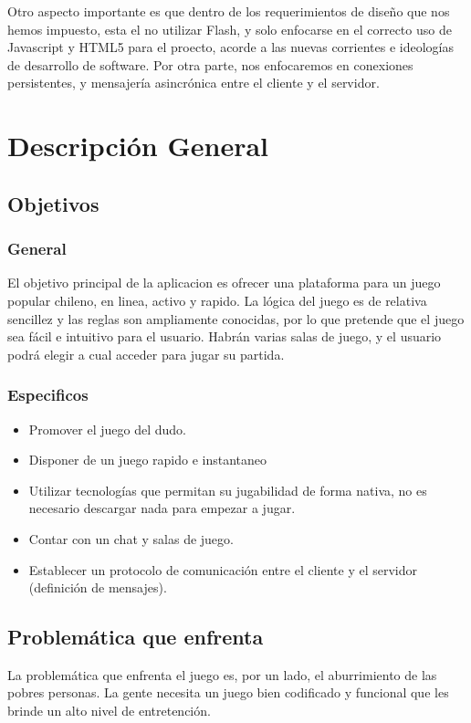 \documentclass[a4paper,11pt]{article}
\begin{document}
	Otro aspecto importante es que dentro de los requerimientos de diseño
que nos hemos impuesto, esta el no utilizar Flash, y solo enfocarse en el 
correcto uso de Javascript y HTML5 para el proecto, acorde a las nuevas 
corrientes e ideologías de desarrollo de software. Por otra parte, nos 
enfocaremos en conexiones persistentes, y mensajería asincrónica entre el 
cliente y el servidor.

\newpage
\section{Descripción General}
\subsection{Objetivos}
\subsubsection{General}

	El objetivo principal de la aplicacion es ofrecer una plataforma para
un juego popular chileno, en linea, activo y rapido. La lógica del juego
es de relativa sencillez y las reglas son ampliamente conocidas, por lo que
pretende que el juego sea fácil e intuitivo para el usuario. Habrán varias
salas de juego, y el usuario podrá elegir a cual acceder para jugar su partida.


\subsubsection{Especificos}
\begin{itemize}
	\item Promover el juego del dudo.
	\item Disponer de un juego rapido e instantaneo
	\item Utilizar tecnologías que permitan su jugabilidad de forma nativa,
	no es necesario descargar nada para empezar a jugar.
	\item Contar con un chat y salas de juego.
	\item Establecer un protocolo de comunicación entre el cliente y el servidor (definición de mensajes).
\end{itemize}

\subsection{Problemática que enfrenta}

	La problemática que enfrenta el juego es, por un lado, el aburrimiento de las pobres personas. La gente necesita un juego bien codificado y funcional
que les brinde un alto nivel de entretención.\\
\end{document}
